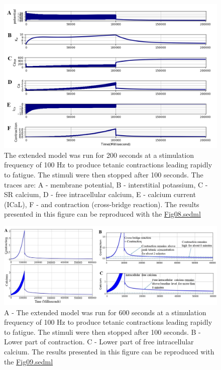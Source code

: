\documentclass[fleqn,10pt]{physiome}
\begin{document}
\begin{figure}[h!]
\centering
\includegraphics[width=0.9\linewidth]{figure07}
\caption{The extended model was run for 200 seconds at a stimulation frequency of 100 Hz to produce tetanic contractions leading rapidly to fatigue. The stimuli were then stopped after 100 seconds. The traces are: A - membrane potential, B - interstitial potassium, C - SR calcium, D - free intracellular calcium, E - calcium current (ICaL), F - and contraction (cross-bridge reaction). The results presented in this figure can be reproduced with the \href{https://models.physiomeproject.org/workspace/5f4/file/26289d9227fbf4f66ca8106d8bf80ff9a51a5ac6/Fig08.sedml}{Fig08.sedml}}
\label{fig07}
\end{figure}

\begin{figure}[h!]
\centering
\includegraphics[width=1\linewidth]{figure8-}
\caption{A - The extended model was run for 600 seconds at a stimulation frequency of 100 Hz to produce tetanic contractions leading rapidly to fatigue. The stimuli were then stopped after 100 seconds. 
B - Lower part of contraction. C - Lower part of free intracellular calcium. The results presented in this figure can be reproduced with the \href{https://models.physiomeproject.org/workspace/5f4/file/26289d9227fbf4f66ca8106d8bf80ff9a51a5ac6/Fig09.sedml}{Fig09.sedml}}
\label{fig08}
\end{figure}\newpage
\end{document}
